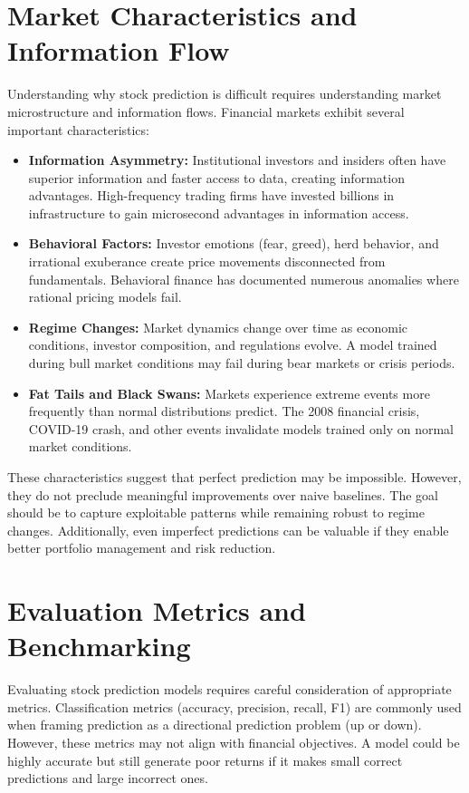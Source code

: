 \section{Market Characteristics and Information Flow}

Understanding why stock prediction is difficult requires understanding market microstructure and information flows. Financial markets exhibit several important characteristics:

\begin{itemize}
    \item \textbf{Information Asymmetry:} Institutional investors and insiders often have superior information and faster access to data, creating information advantages. High-frequency trading firms have invested billions in infrastructure to gain microsecond advantages in information access.
    \item \textbf{Behavioral Factors:} Investor emotions (fear, greed), herd behavior, and irrational exuberance create price movements disconnected from fundamentals. Behavioral finance has documented numerous anomalies where rational pricing models fail.
    \item \textbf{Regime Changes:} Market dynamics change over time as economic conditions, investor composition, and regulations evolve. A model trained during bull market conditions may fail during bear markets or crisis periods.
    \item \textbf{Fat Tails and Black Swans:} Markets experience extreme events more frequently than normal distributions predict. The 2008 financial crisis, COVID-19 crash, and other events invalidate models trained only on normal market conditions.
\end{itemize}

These characteristics suggest that perfect prediction may be impossible. However, they do not preclude meaningful improvements over naive baselines. The goal should be to capture exploitable patterns while remaining robust to regime changes. Additionally, even imperfect predictions can be valuable if they enable better portfolio management and risk reduction.

\section{Evaluation Metrics and Benchmarking}

Evaluating stock prediction models requires careful consideration of appropriate metrics. Classification metrics (accuracy, precision, recall, F1) are commonly used when framing prediction as a directional prediction problem (up or down). However, these metrics may not align with financial objectives. A model could be highly accurate but still generate poor returns if it makes small correct predictions and large incorrect ones.

